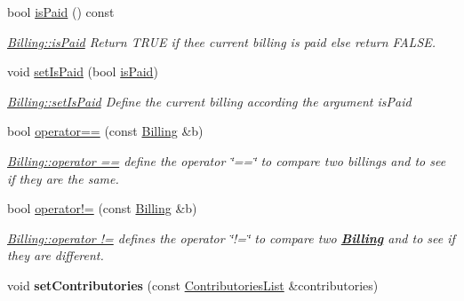\begin{DoxyCompactItemize}
bool \hyperlink{classModels_1_1Billing_ab2f9bd62e920be8c68313e35bbcabd46}{is\-Paid} () const 
\begin{DoxyCompactList}\small\item\em \hyperlink{classModels_1_1Billing_ab2f9bd62e920be8c68313e35bbcabd46}{Billing\-::is\-Paid} Return T\-R\-U\-E if thee current billing is paid else return F\-A\-L\-S\-E. \end{DoxyCompactList}\item 
void \hyperlink{classModels_1_1Billing_a99cf8c1b7435fe268b8fa9257cad6c56}{set\-Is\-Paid} (bool \hyperlink{classModels_1_1Billing_ab2f9bd62e920be8c68313e35bbcabd46}{is\-Paid})
\begin{DoxyCompactList}\small\item\em \hyperlink{classModels_1_1Billing_a99cf8c1b7435fe268b8fa9257cad6c56}{Billing\-::set\-Is\-Paid} Define the current billing according the argument {\itshape is\-Paid} \end{DoxyCompactList}\item 
bool \hyperlink{classModels_1_1Billing_af3d8818a1e00eaa707058567fccf045b}{operator==} (const \hyperlink{classModels_1_1Billing}{Billing} \&b)
\begin{DoxyCompactList}\small\item\em \hyperlink{classModels_1_1Billing_af3d8818a1e00eaa707058567fccf045b}{Billing\-::operator ==} define the operator \char`\"{}==\char`\"{} to compare two billings and to see if they are the same. \end{DoxyCompactList}\item 
bool \hyperlink{classModels_1_1Billing_ae6ff88e05384718d57be1be38f250a52}{operator!=} (const \hyperlink{classModels_1_1Billing}{Billing} \&b)
\begin{DoxyCompactList}\small\item\em \hyperlink{classModels_1_1Billing_ae6ff88e05384718d57be1be38f250a52}{Billing\-::operator !=} defines the operator \char`\"{}!=\char`\"{} to compare two {\bfseries \hyperlink{classModels_1_1Billing}{Billing}} and to see if they are different. \end{DoxyCompactList}\item 
\hypertarget{classModels_1_1Billing_acb836caf7aef8e953c432661cb8aa55f}{void {\bfseries set\-Contributories} (const \hyperlink{classModels_1_1ContributoriesList}{Contributories\-List} \&contributories)}\label{classModels_1_1Billing_acb836caf7aef8e953c432661cb8aa55f}


\end{DoxyCompactItemize}
